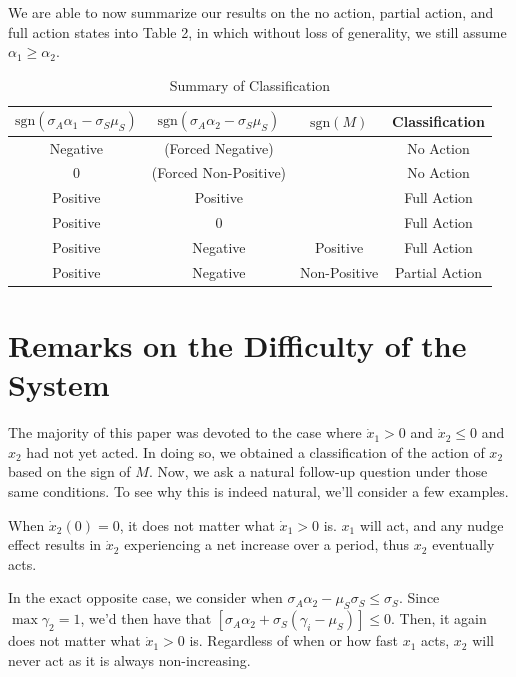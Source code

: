 \documentclass[preprint,12pt]{elsarticle}
\begin{document}
We are able to now summarize our results on the no action, partial action, and full action states into Table 2, in which without loss of generality, we still assume $\alpha_1 \geq \alpha_2$.
\begin{table}[h]
    \begin{center}
    \begin{tabular}{|c|c|c|c|}
    \hline
       $\text{sgn}(\sigma_A\alpha_1 - \sigma_S\mu_S)$  & $\text{sgn}(\sigma_A\alpha_2 - \sigma_S\mu_S)$ & $\text{sgn}(M)$ & Classification \\   \hline
       Negative & (Forced Negative) & &  No Action \\   \hline
       0  & (Forced Non-Positive) &  &  No Action\\   \hline
       Positive  & Positive & &  Full Action \\   \hline
        Positive & 0 &  & Full Action \\   \hline
        Positive & Negative & Positive &  Full Action \\ \hline
        Positive & Negative & Non-Positive &  Partial Action \\ \hline
    \end{tabular}
    \caption{Summary of Classification}
    \label{tab:Classification}
    \end{center}
\end{table}

\section{Remarks on the Difficulty of the System}
The majority of this paper was devoted to the case where $\dot x_1 > 0$ and $\dot x_2 \leq 0$ and $x_2$ had not yet acted. In doing so, we obtained a classification of the action of $x_2$ based on the sign of $M$. Now, we ask a natural follow-up question under those same conditions. To see why this is indeed natural, we'll consider a few examples. 

When $\dot x_2(0) = 0$, it does not matter what $\dot x_1 > 0$ is. $x_1$ will act, and any nudge effect results in $\dot x_2$ experiencing a net increase over a period, thus $x_2$ eventually acts. 

In the exact opposite case, we consider when $\sigma_A\alpha_2 - \mu_S \sigma_S \leq \sigma_S$. Since $ \max \gamma_2 = 1$, we'd then have that $[\sigma_A\alpha_2 +  \sigma_S(\gamma_i - \mu_S)] \leq 0$. Then, it again does not matter what $\dot x_1 > 0$ is. Regardless of when or how fast $x_1$ acts, $x_2$ will never act as it is always non-increasing.
\end{document}
